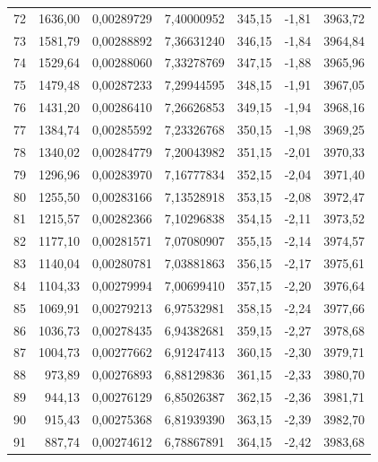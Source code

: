 \documentclass[12pt,a4paper,final,twoside,fleqn]{article}
\begin{document}
\begin{ThreePartTable}
\begin{longtable}{rrrrrrr}
72           & 1636,00   & 0,00289729    & 7,40000952  & 345,15     & -1,81      & 3963,72 \\
73           & 1581,79   & 0,00288892    & 7,36631240  & 346,15     & -1,84      & 3964,84 \\
74           & 1529,64   & 0,00288060    & 7,33278769  & 347,15     & -1,88      & 3965,96 \\
75           & 1479,48   & 0,00287233    & 7,29944595  & 348,15     & -1,91      & 3967,05 \\
76           & 1431,20   & 0,00286410    & 7,26626853  & 349,15     & -1,94      & 3968,16 \\
77           & 1384,74   & 0,00285592    & 7,23326768  & 350,15     & -1,98      & 3969,25 \\
78           & 1340,02   & 0,00284779    & 7,20043982  & 351,15     & -2,01      & 3970,33 \\
79           & 1296,96   & 0,00283970    & 7,16777834  & 352,15     & -2,04      & 3971,40 \\
80           & 1255,50   & 0,00283166    & 7,13528918  & 353,15     & -2,08      & 3972,47 \\
81           & 1215,57   & 0,00282366    & 7,10296838  & 354,15     & -2,11      & 3973,52 \\
82           & 1177,10   & 0,00281571    & 7,07080907  & 355,15     & -2,14      & 3974,57 \\
83           & 1140,04   & 0,00280781    & 7,03881863  & 356,15     & -2,17      & 3975,61 \\
84           & 1104,33   & 0,00279994    & 7,00699410  & 357,15     & -2,20      & 3976,64 \\
85           & 1069,91   & 0,00279213    & 6,97532981  & 358,15     & -2,24      & 3977,66 \\
86           & 1036,73   & 0,00278435    & 6,94382681  & 359,15     & -2,27      & 3978,68 \\
87           & 1004,73   & 0,00277662    & 6,91247413  & 360,15     & -2,30      & 3979,71 \\
88           & 973,89    & 0,00276893    & 6,88129836  & 361,15     & -2,33      & 3980,70 \\
89           & 944,13    & 0,00276129    & 6,85026387  & 362,15     & -2,36      & 3981,71 \\
90           & 915,43    & 0,00275368    & 6,81939390  & 363,15     & -2,39      & 3982,70 \\
91           & 887,74    & 0,00274612    & 6,78867891  & 364,15     & -2,42      & 3983,68 \\

\end{longtable}
\end{ThreePartTable}
\end{document}
